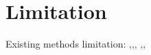 \section{Limitation}
Existing methods limitation: \cite{lancichinetti2011limits},\cite{kawamoto2015limitations},\cite{xiang2012multi},\cite{aldecoa2013exploring} ,\cite{xiang2012limitation}, 